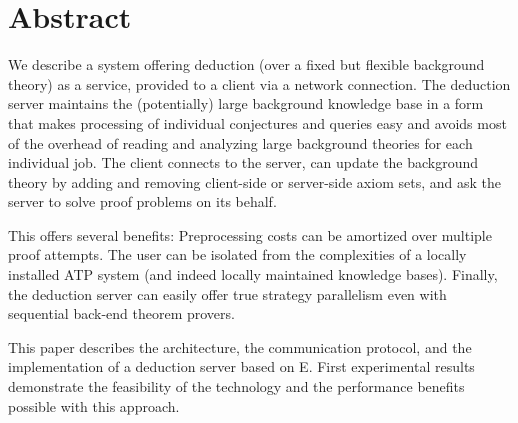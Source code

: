 \chapter*{Abstract} 
\label{chap:abstract} 
 
We describe a system offering deduction (over a fixed but flexible background theory) as a service, provided to a client via a network connection. The deduction server maintains the (potentially) large background knowledge base in a form that makes processing of individual conjectures and queries easy and avoids most of the overhead of reading and analyzing large background theories for each individual job. The client connects to the server, can update the background theory by adding and removing client-side or server-side axiom sets, and ask the server to solve proof problems on its behalf. 
 
This offers several benefits: Preprocessing costs can be amortized over multiple proof attempts. The user can be isolated from the complexities of a locally installed ATP system (and indeed locally maintained knowledge bases). Finally, the deduction server can easily offer true strategy parallelism even with sequential back-end theorem provers. 
 
This paper describes the architecture, the communication protocol, and the implementation of a deduction server based on E. First experimental results demonstrate the feasibility of the technology and the performance benefits possible with this approach. 
 
